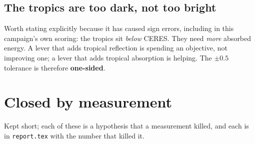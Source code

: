 \documentclass[10pt]{article}
\begin{document}
\subsection{The tropics are too dark, not too bright}
Worth stating explicitly because it has caused sign errors, including in this campaign's
own scoring: the tropics sit \emph{below} CERES. They need \emph{more} absorbed energy. A
lever that adds tropical reflection is spending an objective, not improving one; a lever
that adds tropical absorption is helping. The $\pm0.5$ tolerance is therefore
\textbf{one-sided}.

\section{Closed by measurement}\label{sec:closed}

Kept short; each of these is a hypothesis that a measurement killed, and each is in
\texttt{report.tex} with the number that killed it.
\end{document}

